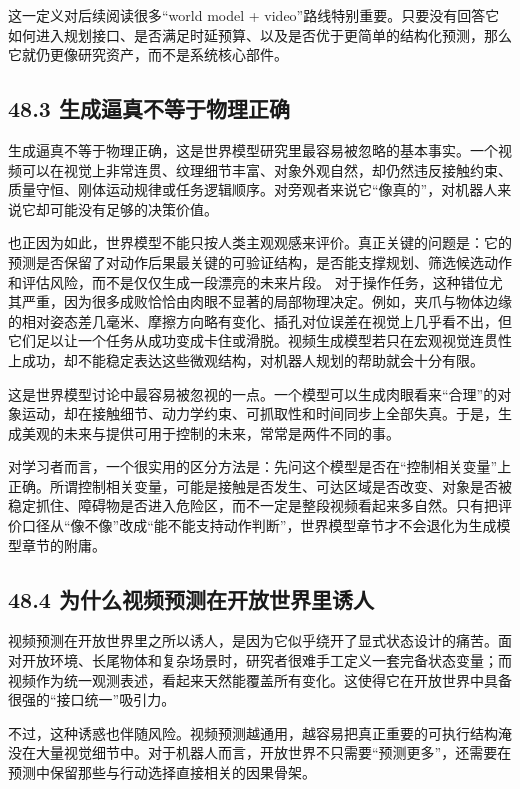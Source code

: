 这一定义对后续阅读很多“world model + video”路线特别重要。只要没有回答它如何进入规划接口、是否满足时延预算、以及是否优于更简单的结构化预测，那么它就仍更像研究资产，而不是系统核心部件。

\subsection*{48.3 生成逼真不等于物理正确}


生成逼真不等于物理正确，这是世界模型研究里最容易被忽略的基本事实。一个视频可以在视觉上非常连贯、纹理细节丰富、对象外观自然，却仍然违反接触约束、质量守恒、刚体运动规律或任务逻辑顺序。对旁观者来说它“像真的”，对机器人来说它却可能没有足够的决策价值。

也正因为如此，世界模型不能只按人类主观观感来评价。真正关键的问题是：它的预测是否保留了对动作后果最关键的可验证结构，是否能支撑规划、筛选候选动作和评估风险，而不是仅仅生成一段漂亮的未来片段。 对于操作任务，这种错位尤其严重，因为很多成败恰恰由肉眼不显著的局部物理决定。例如，夹爪与物体边缘的相对姿态差几毫米、摩擦方向略有变化、插孔对位误差在视觉上几乎看不出，但它们足以让一个任务从成功变成卡住或滑脱。视频生成模型若只在宏观视觉连贯性上成功，却不能稳定表达这些微观结构，对机器人规划的帮助就会十分有限。

这是世界模型讨论中最容易被忽视的一点。一个模型可以生成肉眼看来“合理”的对象运动，却在接触细节、动力学约束、可抓取性和时间同步上全部失真。于是，生成美观的未来与提供可用于控制的未来，常常是两件不同的事。

对学习者而言，一个很实用的区分方法是：先问这个模型是否在“控制相关变量”上正确。所谓控制相关变量，可能是接触是否发生、可达区域是否改变、对象是否被稳定抓住、障碍物是否进入危险区，而不一定是整段视频看起来多自然。只有把评价口径从“像不像”改成“能不能支持动作判断”，世界模型章节才不会退化为生成模型章节的附庸。

\subsection*{48.4 为什么视频预测在开放世界里诱人}


视频预测在开放世界里之所以诱人，是因为它似乎绕开了显式状态设计的痛苦。面对开放环境、长尾物体和复杂场景时，研究者很难手工定义一套完备状态变量；而视频作为统一观测表述，看起来天然能覆盖所有变化。这使得它在开放世界中具备很强的“接口统一”吸引力。

不过，这种诱惑也伴随风险。视频预测越通用，越容易把真正重要的可执行结构淹没在大量视觉细节中。对于机器人而言，开放世界不只需要“预测更多”，还需要在预测中保留那些与行动选择直接相关的因果骨架。

